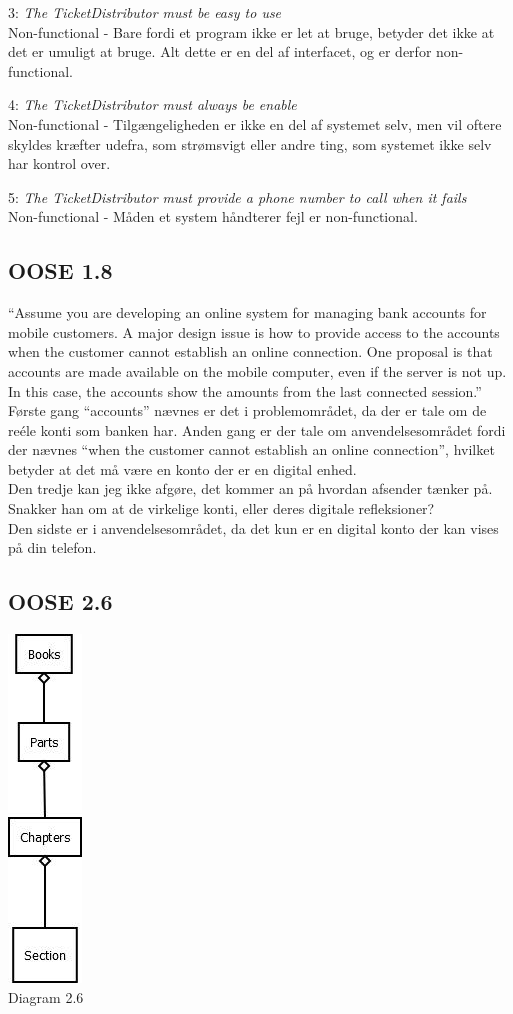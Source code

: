 \documentclass{article}
\begin{document}
3: \textit{The TicketDistributor must be easy to use} \\
Non-functional - Bare fordi et program ikke er let at bruge, betyder det ikke at det er umuligt at bruge. Alt dette er en del af interfacet, og er derfor non-functional.

4: \textit{The TicketDistributor must always be enable} \\
Non-functional - Tilgængeligheden er ikke en del af systemet selv, men vil oftere skyldes kræfter udefra, som strømsvigt eller andre ting, som systemet ikke selv har kontrol over.

5: \textit{The TicketDistributor must provide a phone number to call when it fails} \\
Non-functional - Måden et system håndterer fejl er non-functional.

\subsection{OOSE 1.8}
“Assume you are developing an online system for managing bank accounts for
mobile customers. A major design issue is how to provide access to the accounts
when the customer cannot establish an online connection. One proposal is that
accounts are made available on the mobile computer, even if the server is not up. In
this case, the accounts show the amounts from the last connected session.”
\\
Første gang “accounts” nævnes er det i problemområdet, da der er tale om de reéle konti som banken har.
Anden gang er der tale om anvendelsesområdet fordi der nævnes “when the customer cannot establish an online connection”, hvilket betyder at det må være en konto der er en digital enhed.
\\	
Den tredje kan jeg ikke afgøre, det kommer an på hvordan afsender tænker på. Snakker han om at de virkelige konti, eller deres digitale refleksioner? \\
Den sidste er i anvendelsesområdet, da det kun er en digital konto der kan vises på din telefon.

\subsection{OOSE 2.6}
\includegraphics[scale=.5]{2_6.jpg} \\{\footnotesize Diagram 2.6}
\end{document}
